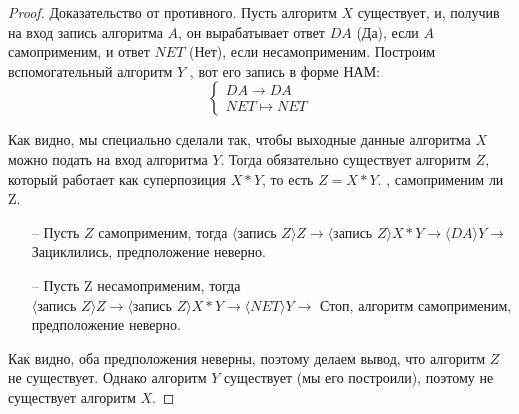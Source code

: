 \begin{proof} Доказательство от противного. Пусть алгоритм $X$ существует, и, получив на вход запись алгоритма $A$, он вырабатывает ответ $DA$ (Да), если $A$ самоприменим, и ответ $NET$ (Нет), если несамоприменим.
Построим вспомогательный алгоритм $Y$ , вот его запись в форме НАМ:
$$\begin{cases} DA \to DA \\ NET \mapsto NET\end{cases}$$

Как видно, мы специально сделали так, чтобы выходные данные алгоритма $X$ можно подать на вход алгоритма $Y$. Тогда обязательно существует алгоритм $Z$, который работает как суперпозиция $X * Y$, то есть $Z = X * Y$. \faEye, самоприменим ли Z.
\begin{itemize}
    \item[--] Пусть $Z$ самоприменим, тогда $\langle \text{запись } Z\rangle Z \to \langle \text{запись } Z \rangle X * Y \to \langle DA \rangle Y \to $ Зациклились, предположение неверно.
    \item[--] Пусть Z несамоприменим, тогда $\langle \text{запись } Z \rangle Z \to \langle \text{запись } Z \rangle X * Y \to \langle NET \rangle Y \to $ Стоп, алгоритм самоприменим, предположение неверно.
\end{itemize} 
Как видно, оба предположения неверны, поэтому делаем вывод, что алгоритм $Z$ не существует. Однако алгоритм $Y$ существует (мы его построили), поэтому не существует алгоритм $X$. 
\end{proof}
    




